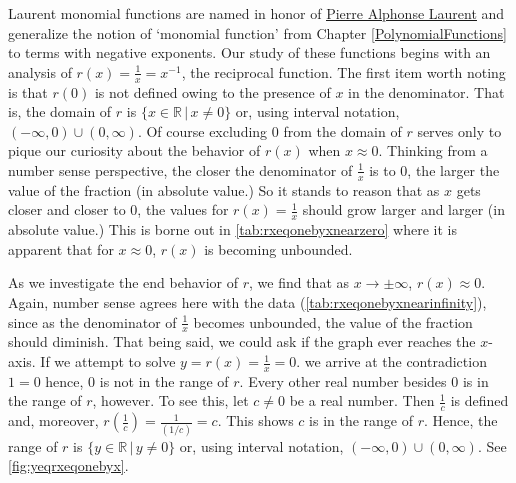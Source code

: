Laurent monomial functions are named in honor of \href{https://en.wikipedia.org/wiki/Pierre_Alphonse_Laurent}{\uline{Pierre Alphonse Laurent}} and generalize the notion of `monomial function' from Chapter \ref{PolynomialFunctions} to terms with negative exponents. Our study of these functions begins with an analysis of   $r(x) = \frac{1}{x} = x^{-1}$, the reciprocal function. The first item worth  noting is that $r(0)$ is not defined owing to the presence of $x$  in the denominator.  That is, the domain of $r$ is $\{ x \in \mathbb{R} \, | \, x \neq 0\}$ or, using interval notation, $(-\infty, 0) \cup (0, \infty)$.   Of course excluding $0$ from the domain of $r$ serves only to pique our curiosity about the behavior of $r(x)$ when $x \approx 0$.  Thinking from a number sense perspective, the closer the denominator of $\frac{1}{x}$ is to $0$, the larger the value of the  fraction (in absolute value.)  So it stands to reason that as $x$ gets closer and closer to $0$, the values for $r(x) = \frac{1}{x}$ should grow larger and larger (in absolute value.)  This is borne out in \autoref{tab:rxeqonebyxnearzero} where it is apparent that for $x \approx 0$, $r(x)$ is becoming unbounded.  

As we investigate the end behavior of $r$, we find that as $x \rightarrow \pm \infty$, $r(x) \approx 0$. Again, number sense agrees here with the data (\autoref{tab:rxeqonebyxnearinfinity}), since as the denominator of $\frac{1}{x}$ becomes unbounded, the value of the fraction should diminish.  That being said, we could ask if the graph ever reaches the $x$-axis.  If we attempt to solve $y = r(x) = \frac{1}{x} = 0$. we arrive at the contradiction $1 = 0$ hence, $0$ is not in the range of $r$.  Every other real number besides $0$ is in the range of $r$, however.  To see this, let $c \neq 0$ be a real number.  Then $\frac{1}{c}$ is defined and, moreover, $r \left(\frac{1}{c} \right) = \frac{1}{(1/c)} = c$.  This shows $c$ is in the range of $r$.  Hence, the range of $r$ is $\{ y \in \mathbb{R} \, | \, y \neq 0\}$ or, using interval notation,  $(-\infty, 0) \cup (0, \infty)$. See \autoref{fig:yeqrxeqonebyx}.


